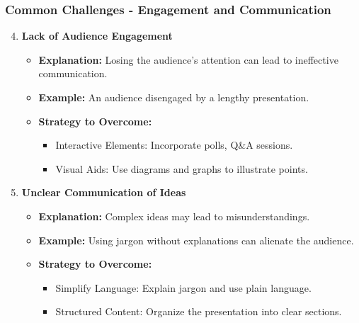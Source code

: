 \documentclass[aspectratio=169]{beamer}
\begin{document}
\begin{frame}[fragile]
    \frametitle{Common Challenges - Engagement and Communication}
    
    \begin{enumerate}
        \setcounter{enumi}{3}
        \item \textbf{Lack of Audience Engagement}
        \begin{itemize}
            \item \textbf{Explanation:} Losing the audience’s attention can lead to ineffective communication.
            \item \textbf{Example:} An audience disengaged by a lengthy presentation.
            \item \textbf{Strategy to Overcome:}
            \begin{itemize}
                \item Interactive Elements: Incorporate polls, Q&A sessions.
                \item Visual Aids: Use diagrams and graphs to illustrate points.
            \end{itemize}
        \end{itemize}
        
        \item \textbf{Unclear Communication of Ideas}
        \begin{itemize}
            \item \textbf{Explanation:} Complex ideas may lead to misunderstandings.
            \item \textbf{Example:} Using jargon without explanations can alienate the audience.
            \item \textbf{Strategy to Overcome:}
            \begin{itemize}
                \item Simplify Language: Explain jargon and use plain language.
                \item Structured Content: Organize the presentation into clear sections.
            \end{itemize}
        \end{itemize}
    \end{enumerate}
\end{frame}
\end{document}
